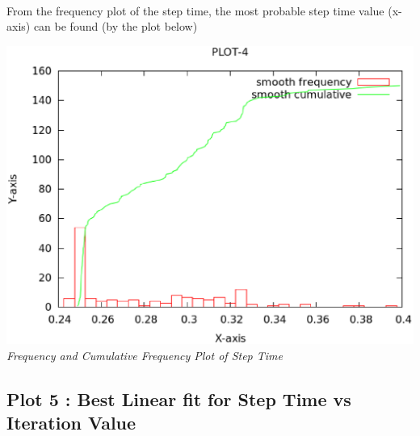\documentclass[11pt]{article}
\begin{document}
\paragraph{}

From the frequency plot of the step time, the most probable step time value (x-axis) 
can be found (by the plot below)
\begin{center}
 \includegraphics[scale = 0.4]{images/plot4} \\
  \emph{Frequency and Cumulative Frequency Plot of Step Time} \\
\end{center}

\subsection{Plot 5 : Best Linear fit for Step Time vs Iteration Value}
\end{document}
